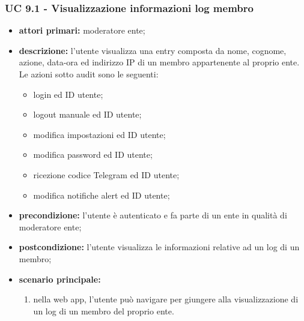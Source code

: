 		\subsubsection{UC 9.1 - Visualizzazione informazioni log membro}
			\begin{itemize}
			\item \textbf{attori primari:} moderatore ente;
			\item \textbf{descrizione:} l'utente visualizza una entry composta da nome, cognome, azione, data-ora ed indirizzo IP di un membro appartenente al proprio ente. Le azioni sotto audit sono le seguenti:

			\begin{itemize}
				\item login ed ID utente;
				\item logout manuale ed ID utente;
				\item modifica impostazioni ed ID utente;
				\item modifica password ed ID utente;
				\item ricezione codice Telegram ed ID utente;
				\item modifica notifiche alert ed ID utente;
			\end{itemize}

			\item \textbf{precondizione:} l'utente è autenticato e fa parte di un ente in qualità di moderatore ente;
			\item \textbf{postcondizione:} l'utente visualizza le informazioni relative ad un log di un membro;
			\item \textbf{scenario principale:}
			\begin{enumerate}
				\item nella web app, l'utente può navigare per giungere alla visualizzazione di un log di un membro del proprio ente.
			\end{enumerate}
		\end{itemize}

		



		



		


